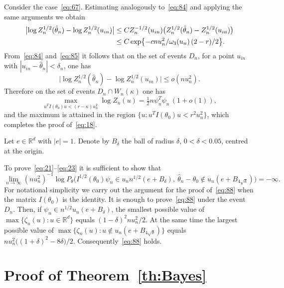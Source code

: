 \documentclass[11pt,a4paper]{article}
\begin{document}
Consider the case~\eqref{eq:67}. Estimating analogously to~\eqref{eq:84} and applying the same arguments we obtain
\begin{align}
\bigl|\log Z_n^{1/2}(\hat\theta_n)-\log Z_n^{1/2}(u_{in})\bigr|
&\le C Z_n^{-1/2}(u_{in})\bigl(Z_n^{1/2}(\hat\theta_n)-Z_n^{1/2}(u_{in})\bigr)\notag\\
&\le C\exp\bigl\{-cnu_n^2/\omega_3(u_n)\,(2-r)/2\bigr\}.
\label{eq:85}
\end{align}
From~\eqref{eq:84} and~\eqref{eq:85} it follows that on the set of events $D_n$, for a point $u_{in}$ with $|u_{in}-\hat\theta_n|<\delta_n$, one has
\begin{equation}
\bigl|\log Z_n^{1/2}(\hat\theta_n)-\log Z_n^{1/2}(u_{in})\bigr|\le o(nu_n^2).
\label{eq:86}
\end{equation}
Therefore on the set of events $D_n\cap W_n(\kappa)$ one has
\begin{equation}
\max_{u^TI(\theta_0)u<(r-\kappa)u_n^2}\log Z_n(u)=\tfrac12 n\psi_n^T\psi_n\,(1+o(1)),
\label{eq:87}
\end{equation}
and the maximum is attained in the region $\{u:u^TI(\theta_0)u<r^2 u_n^2\}$, which completes the proof of~\eqref{eq:18}.

Let $e\in\mathbb{R}^d$ with $|e|=1$. Denote by $B_\delta$ the ball of radius $\delta$, $0<\delta<0.05$, centred at the origin.

To prove~\eqref{eq:21}--\eqref{eq:23} it is sufficient to show that
\begin{equation}
\lim_{n\to\infty}(nu_n^2)^{-1}\log P_\theta\bigl(I^{1/2}(\theta_0)\psi_n\in u_nn^{1/2}(e+B_\delta),\ \hat\theta_n-\theta_0\notin u_n(e+B_{4\sqrt{\delta}})\bigr)=-\infty.
\label{eq:88}
\end{equation}
For notational simplicity we carry out the argument for the proof of~\eqref{eq:88} when the matrix $I(\theta_0)$ is the identity. It is enough to prove~\eqref{eq:88} under the event $D_n$. Then, if $\psi_n\in n^{1/2}u_n(e+B_\delta)$, the smallest possible value of $\max\{\zeta_n(u):u\in\mathbb{R}^d\}$ equals $(1-\delta)^2 nu_n^2/2$. At the same time the largest possible value of $\max\{\zeta_n(u):u\notin u_n(e+B_{4\sqrt{\delta}})\}$ equals $nu_n^2\bigl((1+\delta)^2-8\delta\bigr)/2$. Consequently~\eqref{eq:88} holds.

\section{Proof of Theorem~\ref{th:Bayes}}
\end{document}
